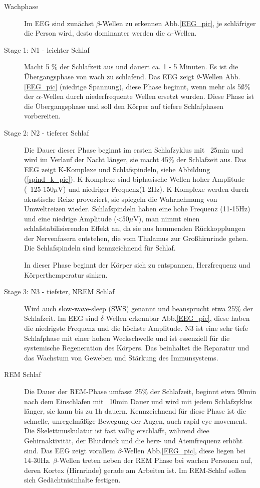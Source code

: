 \documentclass[a4paper, 12pt]{article}
\begin{document}
\begin{description}
	\item[Wachphase] Im EEG sind zunächst \(\beta\)-Wellen zu erkennen Abb.\ref{EEG_pic}, je schläfriger die Person wird, desto dominanter werden die \(\alpha\)-Wellen.

	\item[Stage 1: N1 - leichter Schlaf] Macht 5 \% der Schlafzeit aus und dauert ca. 1 - 5 Minuten. Es ist die Übergangsphase von wach zu schlafend. Das EEG zeigt \(\theta \)-Wellen Abb.\ref{EEG_pic} (niedrige Spannung), diese Phase beginnt, wenn mehr als 5ß\% der \(\alpha\)-Wellen durch niederfrequente Wellen ersetzt wurden. Diese Phase ist die Übergangsphase und soll den Körper auf tiefere Schlafphasen vorbereiten.

	\item[Stage 2: N2 - tieferer Schlaf] Die Dauer dieser Phase beginnt im ersten Schlafzyklus mit ~25min und wird im Verlauf der Nacht länger, sie macht 45\% der Schlafzeit aus. Das EEG zeigt K-Komplexe und Schlafspindeln, siehe Abbildung (\ref{spind_k_pic}). K-Komplexe sind biphasische Wellen hoher Amplitude (~125-150\(\mu\)V) und niedriger Frequenz(1-2Hz). K-Komplexe werden durch akustische Reize provoziert, sie spiegeln die Wahrnehmung von Umweltreizen wieder. Schlafspindeln haben eine hohe Frequenz (11-15Hz) und eine niedrige Amplitude (<50\(\mu\)V), man nimmt einen schlafstabilisierenden Effekt an, da sie aus hemmenden Rückkopplungen der Nervenfasern entstehen, die vom Thalamus zur Großhirnrinde gehen. Die Schlafspindeln sind kennzeichnend für Schlaf. \cite{flexikon} \cite{pschyrembel_267}

In dieser Phase beginnt der Körper sich zu entspannen, Herzfrequenz und Körperthemperatur sinken.

	\item[Stage 3: N3 - tiefster, NREM Schlaf] Wird auch slow-wave-sleep (SWS) genannt und beansprucht etwa 25\% der Schlafzeit. Im EEG sind \(\delta\)-Wellen erkennbar Abb.\ref{EEG_pic}, diese haben die niedrigste Frequenz und die höchste Amplitude. N3 ist eine sehr tiefe Schlafphase mit einer hohen Weckschwelle und ist essenziell für die systemische Regeneration des Körpers. Das beinhaltet die Reparatur und das Wachstum von Geweben und Stärkung des Immunsystems.

	\item[REM Schlaf] Die Dauer der REM-Phase umfasst 25\% der Schlafzeit, beginnt etwa 90min nach dem Einschlafen mit ~10min Dauer und wird mit jedem Schlafzyklus länger, sie kann bis zu 1h dauern. Kennzeichnend für diese Phase ist die schnelle, unregelmäßige Bewegung der Augen, auch rapid eye movement. Die Skelettmuskulatur ist fast völlig erschlafft, während diee Gehirnaktivität, der Blutdruck und die herz- und Atemfrequenz erhöht sind. Das EEG zeigt vorallem \(\beta\)-Wellen Abb.\ref{EEG_pic}, diese liegen bei 14-30Hz. \(\beta\)-Wellen treten neben der REM Phase bei wachen Personen auf, deren Kortex (Hirnrinde) gerade am Arbeiten ist. Im REM-Schlaf sollen sich Gedächtnisinhalte festigen. \cite{flexikon}
\end{description}
\end{document}
